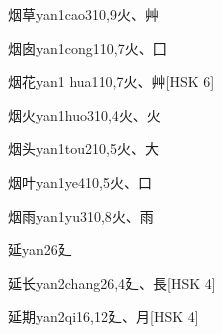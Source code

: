\begin{EntryWithPhonetic}{烟草}{yan1cao3}{10,9}{⽕、⾋}
\end{EntryWithPhonetic}

\begin{EntryWithPhonetic}{烟囱}{yan1cong1}{10,7}{⽕、⼞}
\end{EntryWithPhonetic}

\begin{EntryWithPhonetic}{烟花}{yan1 hua1}{10,7}{⽕、⾋}[HSK 6]
\end{EntryWithPhonetic}

\begin{EntryWithPhonetic}{烟火}{yan1huo3}{10,4}{⽕、⽕}
\end{EntryWithPhonetic}

\begin{EntryWithPhonetic}{烟头}{yan1tou2}{10,5}{⽕、⼤}
\end{EntryWithPhonetic}

\begin{EntryWithPhonetic}{烟叶}{yan1ye4}{10,5}{⽕、⼝}
\end{EntryWithPhonetic}

\begin{EntryWithPhonetic}{烟雨}{yan1yu3}{10,8}{⽕、⾬}
\end{EntryWithPhonetic}

\begin{EntryWithPhonetic}{延}{yan2}{6}{⼵}
\end{EntryWithPhonetic}

\begin{EntryWithPhonetic}{延长}{yan2chang2}{6,4}{⼵、⾧}[HSK 4]
\end{EntryWithPhonetic}

\begin{EntryWithPhonetic}{延期}{yan2qi1}{6,12}{⼵、⽉}[HSK 4]
\end{EntryWithPhonetic}


